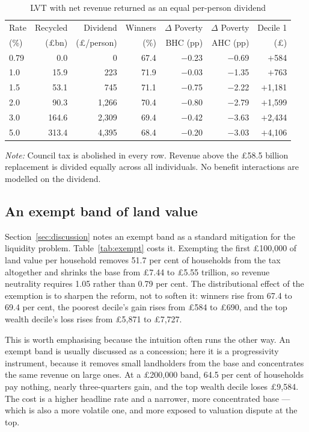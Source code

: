 \begin{table}[htbp]
\centering
\caption{LVT with net revenue returned as an equal per-person dividend}
\label{tab:recycling}
\begin{tabular}{lrrrrrr}
\toprule
Rate & Recycled & Dividend & Winners & $\Delta$ Poverty & $\Delta$ Poverty & Decile 1 \\
(\%) & (\pounds bn) & (\pounds/person) & (\%) & BHC (pp) & AHC (pp) & (\pounds) \\
\midrule
0.79 & 0.0   & 0        & 67.4 & $-$0.23 & $-$0.69 & $+$584 \\
1.0  & 15.9  & 223      & 71.9 & $-$0.03 & $-$1.35 & $+$763 \\
1.5  & 53.1  & 745      & 71.1 & $-$0.75 & $-$2.22 & $+$1{,}181 \\
2.0  & 90.3  & 1{,}266  & 70.4 & $-$0.80 & $-$2.79 & $+$1{,}599 \\
3.0  & 164.6 & 2{,}309  & 69.4 & $-$0.42 & $-$3.63 & $+$2{,}434 \\
5.0  & 313.4 & 4{,}395  & 68.4 & $-$0.20 & $-$3.03 & $+$4{,}106 \\
\bottomrule
\end{tabular}

\medskip
{\footnotesize\emph{Note:} Council tax is abolished in every row. Revenue above the \pounds 58.5 billion replacement is divided equally across all individuals. No benefit interactions are modelled on the dividend.}
\end{table}

\subsection{An exempt band of land value}
\label{sec:exemptband}

Section~\ref{sec:discussion} notes an exempt band as a standard mitigation for the liquidity problem. Table~\ref{tab:exempt} costs it. Exempting the first \pounds 100{,}000 of land value per household removes 51.7 per cent of households from the tax altogether and shrinks the base from \pounds 7.44 to \pounds 5.55 trillion, so revenue neutrality requires 1.05 rather than 0.79 per cent. The distributional effect of the exemption is to sharpen the reform, not to soften it: winners rise from 67.4 to 69.4 per cent, the poorest decile's gain rises from \pounds 584 to \pounds 690, and the top wealth decile's loss rises from \pounds 5{,}871 to \pounds 7{,}727.

This is worth emphasising because the intuition often runs the other way. An exempt band is usually discussed as a concession; here it is a progressivity instrument, because it removes small landholders from the base and concentrates the same revenue on large ones. At a \pounds 200{,}000 band, 64.5 per cent of households pay nothing, nearly three-quarters gain, and the top wealth decile loses \pounds 9{,}584. The cost is a higher headline rate and a narrower, more concentrated base --- which is also a more volatile one, and more exposed to valuation dispute at the top.

